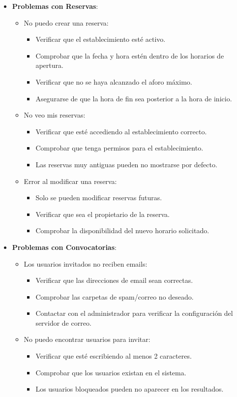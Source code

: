 \begin{itemize}
   \item \textbf{Problemas con Reservas}:
   \begin{itemize}
      \item No puedo crear una reserva:
      \begin{itemize}
         \item Verificar que el establecimiento esté activo.
         \item Comprobar que la fecha y hora estén dentro de los horarios de apertura.
         \item Verificar que no se haya alcanzado el aforo máximo.
         \item Asegurarse de que la hora de fin sea posterior a la hora de inicio.
      \end{itemize}
      \item No veo mis reservas:
      \begin{itemize}
         \item Verificar que esté accediendo al establecimiento correcto.
         \item Comprobar que tenga permisos para el establecimiento.
         \item Las reservas muy antiguas pueden no mostrarse por defecto.
      \end{itemize}
      \item Error al modificar una reserva:
      \begin{itemize}
         \item Solo se pueden modificar reservas futuras.
         \item Verificar que sea el propietario de la reserva.
         \item Comprobar la disponibilidad del nuevo horario solicitado.
      \end{itemize}
   \end{itemize}

   \item \textbf{Problemas con Convocatorias}:
   \begin{itemize}
      \item Los usuarios invitados no reciben emails:
      \begin{itemize}
         \item Verificar que las direcciones de email sean correctas.
         \item Comprobar las carpetas de spam/correo no deseado.
         \item Contactar con el administrador para verificar la configuración del servidor de correo.
      \end{itemize}
      \item No puedo encontrar usuarios para invitar:
      \begin{itemize}
         \item Verificar que esté escribiendo al menos 2 caracteres.
         \item Comprobar que los usuarios existan en el sistema.
         \item Los usuarios bloqueados pueden no aparecer en los resultados.
      \end{itemize}
   \end{itemize}


\end{itemize}
